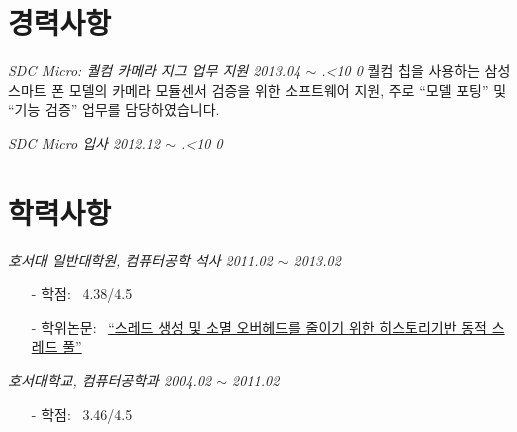 \documentclass[line,margin]{res}
\renewcommand{\today}{\number\year.\ifnum\number\month<10 0\fi \number\month}
\begin{document}
\begin{resume}
  \section{경력사항}

  {\sl SDC Micro: 퀄컴 카메라 지그 업무 지원 \hfill 2013.04 $\sim$ \today}
  \vspace{1mm}
  \newline
  {
    \small
    퀄컴 칩을 사용하는 삼성 스마트 폰 모델의 카메라 모듈센서 검증을 위한 소프트웨어 지원,
    주로 ``모델 포팅'' 및 ``기능 검증'' 업무를 담당하였습니다.
  }

  {\sl SDC Micro 입사 \hfill 2012.12 $\sim$ \today}
  \vspace{0mm}


  \section{학력사항}

  {\sl 호서대 일반대학원, 컴퓨터공학 석사 \hfill 2011.02 $\sim$ 2013.02}
  \vspace{-4mm}
  {
    \small
    \begin{itemize}
    \item[-] 학점: ~4.38/4.5 \vspace{-1mm}
    \item[-] 학위논문: ~\href{http://dlibrary.hoseo.ac.kr/search/DetailView.ax?sid=4&cid=950591}
      {``스레드 생성 및 소멸 오버헤드를 줄이기 위한 히스토리기반 동적 스레드 풀''}
    \end{itemize}
  }

  {\sl 호서대학교, 컴퓨터공학과 \hfill 2004.02 $\sim$ 2011.02}
  \vspace{-4mm}
  {
    \small
    \begin{itemize}
    \item[-] 학점: ~3.46/4.5
    \end{itemize}
  }


\end{resume}

\end{document}
